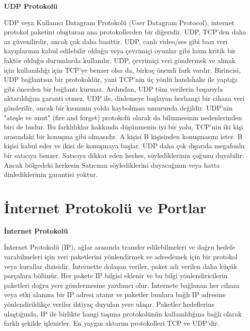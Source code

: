 \vspace{10mm}
\textbf{UDP Protokolü}
\vspace{5mm}

UDP veya Kullanıcı Datagram Protokolü (User Datagram Protocol), internet protokol paketini oluşturan ana protokollerden bir diğeridir. UDP, TCP'den daha az güvenilirdir, ancak çok daha basittir.
UDP, canlı video/ses gibi bazı veri kayıplarının kabul edilebilir olduğu veya çevrimiçi oyunlar gibi hızın kritik bir faktör olduğu durumlarda kullanılır.
UDP, çevrimiçi veri göndermek ve almak için kullanıldığı için TCP'ye benzer olsa da, birkaç önemli fark vardır.
Birincisi, UDP bağlantısız bir protokoldür, yani TCP'nin üç yönlü handshake ile yaptığı gibi önceden bir bağlantı kurmaz.
Ardından, UDP tüm verilerin başarıyla aktarıldığını garanti etmez. UDP ile, dinlemeye başlayan herhangi bir cihaza veri gönderilir, ancak bir kısmının yolda kaybolması umurunda değildir. UDP'nin "ateşle ve unut" (fire and forget) protokolü olarak da bilinmesinin nedenlerinden biri de budur.
Bu farklılıklar hakkında düşünmenin iyi bir yolu, TCP'nin iki kişi arasındaki bir konuşma gibi olmasıdır. A kişisi B kişisinden konuşmasını ister. B kişisi kabul eder ve ikisi de konuşmaya başlar.
UDP daha çok dışarıda megafonlu bir satıcıya benzer. Satıcıya dikkat eden herkes, söylediklerinin çoğunu duyabilir. Ancak bölgedeki herkesin Satıcının söylediklerini duyacağının veya hatta dinlediklerinin garantisi yoktur.

\vspace{10mm}


\section{İnternet Protokolü ve Portlar}

\vspace{5mm}
\textbf{İnternet Protokolü}
\vspace{5mm}

İnternet Protokolü (IP), ağlar arasında transfer edilebilmeleri ve doğru hedefe varabilmeleri için veri paketlerini yönlendirmek ve adreslemek için bir protokol veya kurallar dizisidir. İnternette dolaşan veriler, paket adı verilen daha küçük parçalara bölünür. Her pakete IP bilgisi eklenir ve bu bilgi yönlendiricilerin paketleri doğru yere göndermesine yardımcı olur. İnternete bağlanan her cihaza veya etki alanına bir IP adresi atanır ve paketler bunlara bağlı IP adresine yönlendirildikçe veriler ihtiyaç duyulan yere ulaşır. Paketler hedeflerine ulaştığında, IP ile birlikte hangi taşıma protokolünün kullanıldığına bağlı olarak farklı şekilde işlenirler. En yaygın aktarım protokolleri TCP ve UDP'dir.

